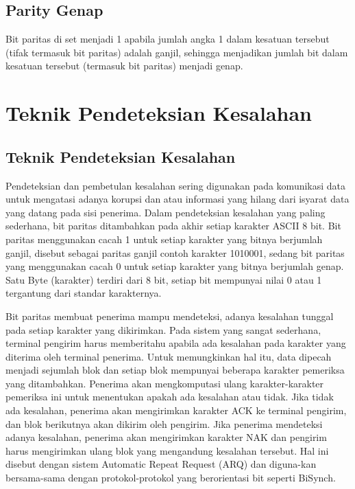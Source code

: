 \subsection{Parity Genap}
Bit paritas di set menjadi 1 apabila jumlah angka 1 dalam kesatuan tersebut (tifak termasuk bit paritas) adalah ganjil, sehingga menjadikan jumlah bit dalam kesatuan tersebut (termasuk bit paritas) menjadi genap.


\section{Teknik Pendeteksian Kesalahan}
\subsection{Teknik Pendeteksian Kesalahan}
Pendeteksian dan pembetulan kesalahan sering digunakan pada komunikasi data untuk mengatasi adanya korupsi dan atau informasi yang hilang dari isyarat data yang datang pada sisi penerima. Dalam pendeteksian kesalahan yang paling sederhana, bit paritas ditambahkan pada akhir setiap karakter ASCII 8 bit. Bit paritas menggunakan cacah 1 untuk setiap karakter yang bitnya berjumlah ganjil, disebut sebagai paritas ganjil contoh karakter 1010001, sedang bit paritas yang menggunakan cacah 0 untuk setiap karakter yang bitnya berjumlah genap. Satu Byte (karakter) terdiri dari 8 bit, setiap bit mempunyai nilai 0 atau 1 tergantung dari standar karakternya.

Bit paritas membuat penerima mampu mendeteksi, adanya kesalahan tunggal pada setiap karakter yang dikirimkan. Pada sistem yang sangat sederhana, terminal pengirim harus memberitahu apabila ada kesalahan pada karakter yang diterima oleh terminal penerima. Untuk memungkinkan hal itu, data dipecah menjadi sejumlah blok dan setiap blok mempunyai beberapa karakter pemeriksa yang ditambahkan. Penerima akan mengkomputasi ulang karakter-karakter pemeriksa ini untuk menentukan apakah ada kesalahan atau tidak. Jika tidak ada
kesalahan, penerima akan mengirimkan karakter ACK ke terminal pengirim, dan blok berikutnya akan dikirim oleh pengirim. Jika penerima mendeteksi adanya kesalahan, penerima akan mengirimkan karakter NAK dan pengirim harus mengirimkan ulang blok yang mengandung kesalahan tersebut. Hal ini disebut dengan sistem Automatic Repeat Request (ARQ) dan diguna-kan bersama-sama dengan protokol-protokol yang berorientasi bit seperti BiSynch.





